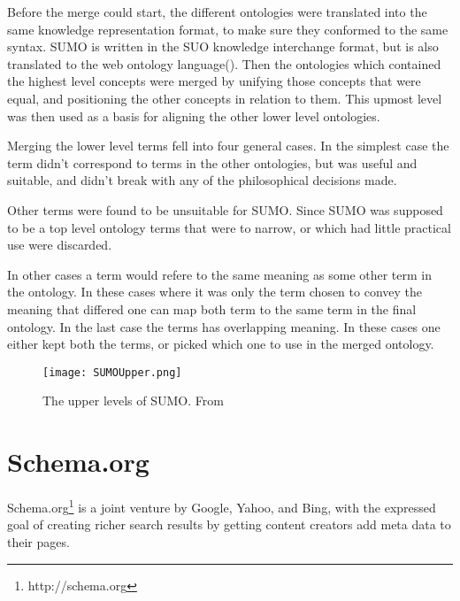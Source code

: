 Before the merge could start, the different ontologies were translated into the same knowledge representation format,
to make sure they conformed to the same syntax\citep{Niles2001}.
SUMO is written in the SUO knowledge interchange format, 
but is also translated to the web ontology language()\citep{Benzmuller2012}.
Then the ontologies which contained the highest level concepts were merged by unifying those concepts that were equal,
and positioning the other concepts in relation to them.
This upmost level was then used as a basis for aligning the other lower level ontologies\citep{Niles2001}.


Merging the lower level terms fell into four general cases.
In the simplest case the term didn't correspond to terms in the other ontologies, 
but was useful and suitable, and didn't break with any of the philosophical decisions made.

Other terms were found to be unsuitable for SUMO.
Since SUMO was supposed to be a top level ontology terms that were to narrow, 
or which had little practical use were discarded.

In other cases a term would refere to the same meaning as some other term in the ontology. 
In these cases where it was only the term chosen to convey the meaning that differed one can map both term to the same
term in the final ontology.
In the last case the terms has overlapping meaning. 
In these cases one either kept both the terms, or picked which one to use in the merged ontology.

\begin{figure}[h]
    \begin{center}
        \texttt{[image: SUMOUpper.png]}
        \caption{The upper levels of SUMO. From \protect \citet{Niles2001}}
        \label{SUMOUpper}
    \end{center}
\end{figure}

\section{Schema.org}
Schema.org\footnote{http://schema.org} is a joint venture by Google, Yahoo, and Bing, 
with the expressed goal of creating richer search results by getting content creators add meta data to their pages\citep{Guha2011}.
